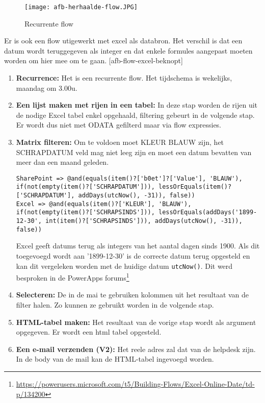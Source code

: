 \begin{figure}[h!]
    \texttt{[image: afb-herhaalde-flow.JPG]}
    \caption{Recurrente flow}
    \label{fig:recurrent-flow-excel}
\end{figure}

Er is ook een flow utigewerkt met excel als databron. Het verschil is dat een datum wordt teruggegeven als integer en dat enkele formules aangepast moeten worden om hier mee om te gaan. 
[afb-flow-excel-beknopt]

\begin{enumerate}
    \item \textbf{Recurrence:} Het is een recurrente flow. Het tijdschema is wekelijks, maandag om 3.00u.
    \item \textbf{Een lijst maken met rijen in een tabel:} In deze stap worden de rijen uit de nodige Excel tabel enkel opgehaald, filtering gebeurt in de volgende stap. Er wordt dus niet met ODATA gefilterd maar via flow expressies.
    \item \textbf{Matrix filteren:} Om te voldoen moet KLEUR BLAUW zijn, het SCHRAPDATUM veld mag niet leeg zijn en moet een datum bevatten van meer dan een maand geleden.
\begin{lstlisting}
SharePoint => @and(equals(item()?['b0et']?['Value'], 'BLAUW'), if(not(empty(item()?['SCHRAPDATUM'])), lessOrEquals(item()?['SCHRAPDATUM'], addDays(utcNow(), -31)), false))
Excel => @and(equals(item()?['KLEUR'], 'BLAUW'), if(not(empty(item()?['SCHRAPSINDS'])), lessOrEquals(addDays('1899-12-30', int(item()?['SCHRAPSINDS'])), addDays(utcNow(), -31)), false))
\end{lstlisting}
    Excel geeft datums terug als integers van het aantal dagen sinds 1900. Als dit toegevoegd wordt aan '1899-12-30' is de correcte datum terug opgesteld en kan dit vergeleken worden met de huidige datum \lstinline|utcNow()|. Dit werd besproken in de PowerApps forums\footnote{\url{https://powerusers.microsoft.com/t5/Building-Flows/Excel-Online-Date/td-p/134200}}
    \item \textbf{Selecteren:} De in de mai te gebruiken kolommen uit het resultaat van de filter halen. Zo kunnen ze gebruikt worden in de volgende stap.
    \item \textbf{HTML-tabel maken:} Het resultaat van de vorige stap wordt als argument opgegeven. Er wordt een html tabel opgesteld.
    \item \textbf{Een e-mail verzenden (V2):} Het reele adres zal dat van de helpdesk zijn. In de body van de mail kan de HTML-tabel ingevoegd worden.
\end{enumerate}

